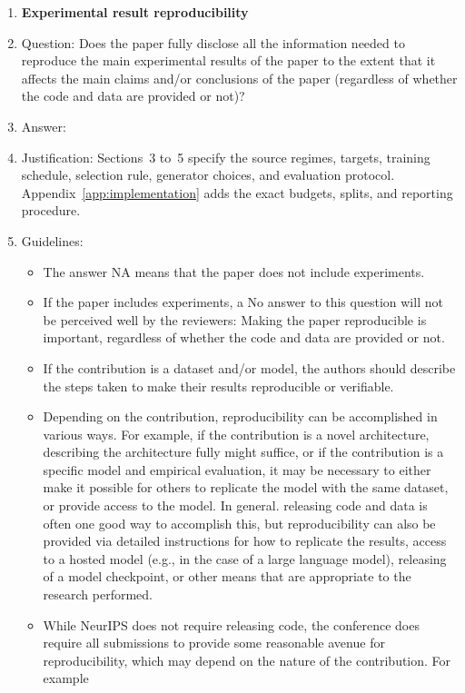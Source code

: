 \documentclass{article}
\begin{document}
\begin{enumerate}
\item {\bf Experimental result reproducibility}
    \item[] Question: Does the paper fully disclose all the information needed to reproduce the main experimental results of the paper to the extent that it affects the main claims and/or conclusions of the paper (regardless of whether the code and data are provided or not)?
    \item[] Answer: \answerYes{}
    \item[] Justification: Sections~3 to~5 specify the source regimes, targets, training schedule, selection rule, generator choices, and evaluation protocol. Appendix~\ref{app:implementation} adds the exact budgets, splits, and reporting procedure.
    \item[] Guidelines:
    \begin{itemize}
        \item The answer NA means that the paper does not include experiments.
        \item If the paper includes experiments, a No answer to this question will not be perceived well by the reviewers: Making the paper reproducible is important, regardless of whether the code and data are provided or not.
        \item If the contribution is a dataset and/or model, the authors should describe the steps taken to make their results reproducible or verifiable. 
        \item Depending on the contribution, reproducibility can be accomplished in various ways. For example, if the contribution is a novel architecture, describing the architecture fully might suffice, or if the contribution is a specific model and empirical evaluation, it may be necessary to either make it possible for others to replicate the model with the same dataset, or provide access to the model. In general. releasing code and data is often one good way to accomplish this, but reproducibility can also be provided via detailed instructions for how to replicate the results, access to a hosted model (e.g., in the case of a large language model), releasing of a model checkpoint, or other means that are appropriate to the research performed.
        \item While NeurIPS does not require releasing code, the conference does require all submissions to provide some reasonable avenue for reproducibility, which may depend on the nature of the contribution. For example
        \begin{enumerate}

\end{enumerate}
\end{itemize}
\end{enumerate}
\end{document}
